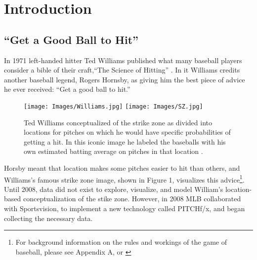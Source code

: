 % 
% 
% 
% 
% 
% 
% 
% 
% 
% 
% 
% 
% 
% 


\section{Introduction} %

\subsection{``Get a Good Ball to Hit''}
In 1971 left-handed hitter Ted Williams published what many baseball players consider a bible of their craft,``The Science of Hitting'' \citep{Williams1971}. In it Williams credits another baseball legend, Rogers Hornsby, as giving him the best piece of advice he ever received: ``Get a good ball to hit.''
        \begin{figure}[H]
      	\centering
      	\texttt{[image: Images/Williams.jpg]} 
      	\texttt{[image: Images/SZ.jpg]}
      	\caption{Ted Williams conceptualized of the strike zone as divided into locations for pitches on which he would have specific probabilities of getting a hit. In this iconic image he labeled the baseballs with his own estimated batting average on pitches in that location \citep{Williams1971}.}
      	\end{figure} 
Horsby meant that location makes some pitches easier to hit than others, and  Williams's famous strike zone image, shown in Figure 1, visualizes this advice\footnote{For background information on the rules and workings of the game of baseball, please see Appendix A, or \citep{Wiki}}. Until 2008, data did not exist to explore, visualize, and model William's location-based conceptualization of the stike zone. However, in 2008 MLB collaborated with Sportsvision, to implement a new technology called PITCHf/x\textsuperscript{\textregistered}, and began collecting the necessary data.


